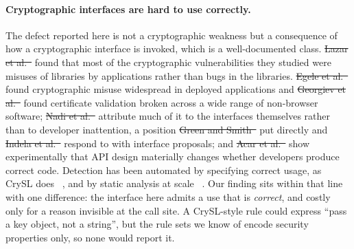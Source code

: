 \documentclass[pdflatex,sn-basic,twocolumn]{sn-jnl}%
\providecommand{\DIFdel}[1]{{\protect\color{red}\sout{#1}}}                      %
\providecommand{\DIFaddbegin}{} %
\providecommand{\DIFaddend}{} %
\providecommand{\DIFdelbegin}{} %
\providecommand{\DIFdelend}{} %
\newcommand{\DIFscaledelfig}{0.5}
\newlength{\DIFdelgraphicswidth} %
\newlength{\DIFdelgraphicsheight} %
\newcommand{\DIFaddincludegraphics}[2][]{{\color{blue}\fbox{\DIFOincludegraphics[#1]{#2}}}} %
\newcommand{\DIFdelincludegraphics}[2][]{%
\sbox{\DIFdelgraphicsbox}{\DIFOincludegraphics[#1]{#2}}%
\settoboxwidth{\DIFdelgraphicswidth}{\DIFdelgraphicsbox} %
\settoboxtotalheight{\DIFdelgraphicsheight}{\DIFdelgraphicsbox} %
\scalebox{\DIFscaledelfig}{%
\parbox[b]{\DIFdelgraphicswidth}{\usebox{\DIFdelgraphicsbox}\\[-\baselineskip] \rule{\DIFdelgraphicswidth}{0em}}\llap{\resizebox{\DIFdelgraphicswidth}{\DIFdelgraphicsheight}{%
\setlength{\unitlength}{\DIFdelgraphicswidth}%
\begin{picture}(1,1)%
\thicklines\linethickness{2pt} %
{\color[rgb]{1,0,0}\put(0,0){\framebox(1,1){}}}%
{\color[rgb]{1,0,0}\put(0,0){\line( 1,1){1}}}%
{\color[rgb]{1,0,0}\put(0,1){\line(1,-1){1}}}%
\end{picture}%
}\hspace*{3pt}}} %
} %
\DeclareRobustCommand{\DIFaddbegin}{\DIFOaddbegin \let\includegraphics\DIFaddincludegraphics} %
\DeclareRobustCommand{\DIFaddend}{\DIFOaddend \let\includegraphics\DIFOincludegraphics} %
\DeclareRobustCommand{\DIFdelbegin}{\DIFOdelbegin \let\includegraphics\DIFdelincludegraphics} %
\DeclareRobustCommand{\DIFdelend}{\DIFOaddend \let\includegraphics\DIFOincludegraphics} %
\begin{document}
\paragraph{Cryptographic interfaces are hard to use correctly.} The defect
reported here is not a cryptographic weakness but a consequence of how a
cryptographic interface is invoked, which is a well-documented class. \DIFdelbegin \DIFdel{Lazar et
al.~}%
\DIFdelend \DIFaddbegin \citet{lazar2014why} \DIFaddend found that most of the cryptographic vulnerabilities
they studied were misuses of libraries by applications rather than bugs in the
libraries. \DIFdelbegin \DIFdel{Egele et al.~}%
\DIFdelend \DIFaddbegin \citet{egele2013empirical} \DIFaddend found cryptographic misuse
widespread in deployed applications and \DIFdelbegin \DIFdel{Georgiev et
al.~}%
\DIFdelend \DIFaddbegin \citet{georgiev2012dangerous} \DIFaddend found certificate validation broken across a
wide range of non-browser software; \DIFdelbegin \DIFdel{Nadi et al.~}%
\DIFdelend \DIFaddbegin \citet{nadi2016jumping}
\DIFaddend attribute much of it to the interfaces themselves rather than to developer
inattention, a position \DIFdelbegin \DIFdel{Green and Smith~}%
\DIFdelend \DIFaddbegin \citet{green2016developers} \DIFaddend put directly
and \DIFdelbegin \DIFdel{Indela et al.~}%
\DIFdelend \DIFaddbegin \citet{indela2016helping} \DIFaddend respond to with interface proposals;
and \DIFdelbegin \DIFdel{Acar et al.~}%
\DIFdelend \DIFaddbegin \citet{acar2017comparing} \DIFaddend show experimentally that API design
materially changes whether developers produce correct code. Detection has been
automated by specifying correct usage, as CrySL does~\DIFdelbegin %
\DIFdelend \DIFaddbegin \citep{kruger2018crysl}\DIFaddend ,
and by static analysis at scale~\DIFdelbegin %
\DIFdelend \DIFaddbegin \citep{rahaman2019cryptoguard}\DIFaddend . Our finding sits
within that line with one difference: the interface here admits a use that is
\emph{correct}, and costly only for a reason invisible at the call site. A
CrySL-style rule could express ``pass a key object, not a string'', but the
rule sets we know of encode security properties only, so none would report it.
\end{document}
